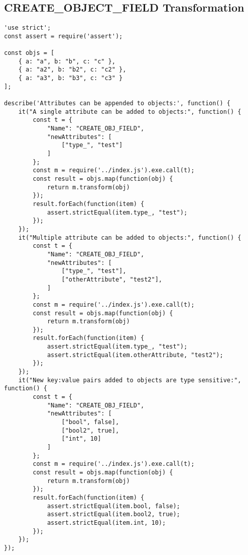 \subsection{CREATE\_OBJECT\_FIELD Transformation}
\label{CREATE_OBJECT_FIELD-tests}
\begin{verbatim}
'use strict';
const assert = require('assert');

const objs = [
    { a: "a", b: "b", c: "c" },
    { a: "a2", b: "b2", c: "c2" },
    { a: "a3", b: "b3", c: "c3" }
];

describe('Attributes can be appended to objects:', function() {
    it("A single attribute can be added to objects:", function() {
        const t = {
            "Name": "CREATE_OBJ_FIELD",
            "newAttributes": [
                ["type_", "test"]
            ]
        };
        const m = require('../index.js').exe.call(t);
        const result = objs.map(function(obj) {
            return m.transform(obj)
        });
        result.forEach(function(item) {
            assert.strictEqual(item.type_, "test");
        });
    });
    it("Multiple attribute can be added to objects:", function() {
        const t = {
            "Name": "CREATE_OBJ_FIELD",
            "newAttributes": [
                ["type_", "test"],
                ["otherAttribute", "test2"],
            ]
        };
        const m = require('../index.js').exe.call(t);
        const result = objs.map(function(obj) {
            return m.transform(obj)
        });
        result.forEach(function(item) {
            assert.strictEqual(item.type_, "test");
            assert.strictEqual(item.otherAttribute, "test2");
        });
    });
    it("New key:value pairs added to objects are type sensitive:", function() {
        const t = {
            "Name": "CREATE_OBJ_FIELD",
            "newAttributes": [
                ["bool", false],
                ["bool2", true],
                ["int", 10]
            ]
        };
        const m = require('../index.js').exe.call(t);
        const result = objs.map(function(obj) {
            return m.transform(obj)
        });
        result.forEach(function(item) {
            assert.strictEqual(item.bool, false);
            assert.strictEqual(item.bool2, true);
            assert.strictEqual(item.int, 10);
        });
    });
});
\end{verbatim}